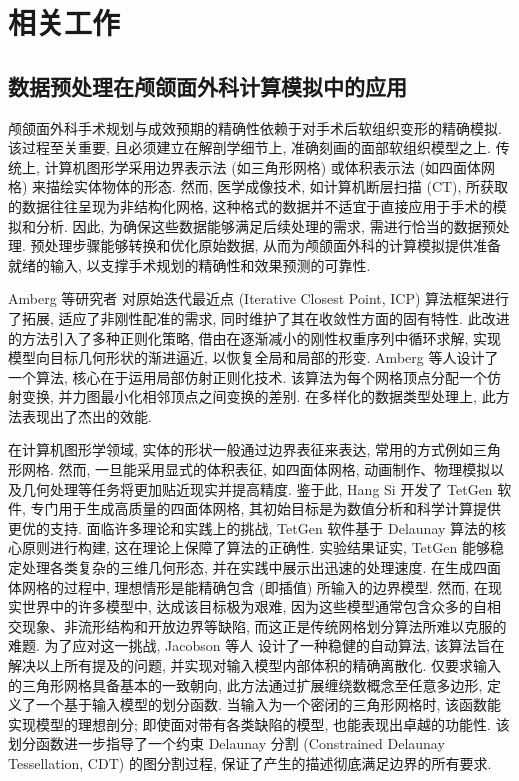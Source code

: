 
\chapter{相关工作}

\section{数据预处理在颅颌面外科计算模拟中的应用}

颅颌面外科手术规划与成效预期的精确性依赖于对手术后软组织变形的精确模拟.
该过程至关重要, 且必须建立在解剖学细节上, 准确刻画的面部软组织模型之上.
传统上, 计算机图形学采用边界表示法 (如三角形网格) 或体积表示法 (如四面体网格) 来描绘实体物体的形态.
然而, 医学成像技术, 如计算机断层扫描 (CT), 所获取的数据往往呈现为非结构化网格, 这种格式的数据并不适宜于直接应用于手术的模拟和分析.
因此, 为确保这些数据能够满足后续处理的需求, 需进行恰当的数据预处理.
预处理步骤能够转换和优化原始数据, 从而为颅颌面外科的计算模拟提供准备就绪的输入, 以支撑手术规划的精确性和效果预测的可靠性.

Amberg 等研究者 \cite{ambergOptimalStepNonrigid2007} 对原始迭代最近点 (Iterative Closest Point, ICP) 算法框架进行了拓展, 适应了非刚性配准的需求, 同时维护了其在收敛性方面的固有特性.
此改进的方法引入了多种正则化策略, 借由在逐渐减小的刚性权重序列中循环求解, 实现模型向目标几何形状的渐进逼近, 以恢复全局和局部的形变.
Amberg 等人设计了一个算法, 核心在于运用局部仿射正则化技术.
该算法为每个网格顶点分配一个仿射变换, 并力图最小化相邻顶点之间变换的差别.
在多样化的数据类型处理上, 此方法表现出了杰出的效能.

在计算机图形学领域, 实体的形状一般通过边界表征来表达, 常用的方式例如三角形网格.
然而, 一旦能采用显式的体积表征, 如四面体网格, 动画制作、物理模拟以及几何处理等任务将更加贴近现实并提高精度.
鉴于此, Hang Si \cite{siTetGenDelaunaybasedQuality2015} 开发了 TetGen 软件, 专门用于生成高质量的四面体网格, 其初始目标是为数值分析和科学计算提供更优的支持.
面临许多理论和实践上的挑战, TetGen 软件基于 Delaunay 算法的核心原则进行构建, 这在理论上保障了算法的正确性.
实验结果证实, TetGen 能够稳定处理各类复杂的三维几何形态, 并在实践中展示出迅速的处理速度.
在生成四面体网格的过程中, 理想情形是能精确包含 (即插值) 所输入的边界模型.
然而, 在现实世界中的许多模型中, 达成该目标极为艰难, 因为这些模型通常包含众多的自相交现象、非流形结构和开放边界等缺陷, 而这正是传统网格划分算法所难以克服的难题.
为了应对这一挑战, Jacobson 等人 \cite{jacobsonRobustInsideoutsideSegmentation2013} 设计了一种稳健的自动算法, 该算法旨在解决以上所有提及的问题, 并实现对输入模型内部体积的精确离散化.
仅要求输入的三角形网格具备基本的一致朝向, 此方法通过扩展缠绕数概念至任意多边形, 定义了一个基于输入模型的划分函数.
当输入为一个密闭的三角形网格时, 该函数能实现模型的理想剖分; 即使面对带有各类缺陷的模型, 也能表现出卓越的功能性.
该划分函数进一步指导了一个约束 Delaunay 分割 (Constrained Delaunay Tessellation, CDT) 的图分割过程, 保证了产生的描述彻底满足边界的所有要求.

